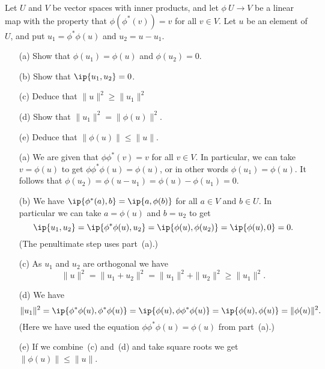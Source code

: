 \begin{exercise}\label{ex-contraction}
 Let $U$ and $V$ be vector spaces with inner products, and
 let $\phi\:U\to V$ be a linear map with the property that
 $\phi(\phi^*(v))=v$ for all $v\in V$.  Let $u$ be an
 element of $U$, and put $u_1=\phi^*\phi(u)$ and $u_2=u-u_1$.
 \begin{itemize}
  \item[(a)] Show that $\phi(u_1)=\phi(u)$ and $\phi(u_2)=0$. 
  \item[(b)] Show that $\ip{u_1,u_2}=0$.
  \item[(c)] Deduce that $\|u\|^2\geq\|u_1\|^2$
  \item[(d)] Show that $\|u_1\|^2=\|\phi(u)\|^2$.
  \item[(e)] Deduce that $\|\phi(u)\|\leq\|u\|$.
 \end{itemize}
\end{exercise}
\begin{solution}
 \begin{itemize}
  \item[(a)] We are given that $\phi\phi^*(v)=v$ for all
   $v\in V$.  In particular, we can take $v=\phi(u)$ to get
   $\phi\phi^*\phi(u)=\phi(u)$, or in other words
   $\phi(u_1)=\phi(u)$.  It follows that
   $\phi(u_2)=\phi(u-u_1)=\phi(u)-\phi(u_1)=0$. 
  \item[(b)] We have $\ip{\phi^*(a),b}=\ip{a,\phi(b)}$ for
   all $a\in V$ and $b\in U$.  In particular we can take
   $a=\phi(u)$ and $b=u_2$ to get 
   \[ \ip{u_1,u_2} = \ip{\phi^*\phi(u),u_2} = 
      \ip{\phi(u),\phi(u_2)} = 
      \ip{\phi(u),0} = 0.
   \]
   (The penultimate step uses part~(a).)
  \item[(c)] As $u_1$ and $u_2$ are orthogonal we have
   \[ \|u\|^2 = \|u_1+u_2\|^2 = \|u_1\|^2 + \|u_2\|^2 \geq 
       \|u_1\|^2.
   \]
  \item[(d)] We have
   \[ \|u_1\|^2 = \ip{\phi^*\phi(u),\phi^*\phi(u)} = 
       \ip{\phi(u),\phi\phi^*\phi(u)} = \ip{\phi(u),\phi(u)}
       = \|\phi(u)\|^2.
   \]
   (Here we have used the equation
   $\phi\phi^*\phi(u)=\phi(u)$ from part~(a).)
  \item[(e)] If we combine~(c) and~(d) and take square roots
   we get $\|\phi(u)\|\leq\|u\|$.
 \end{itemize}
\end{solution}





